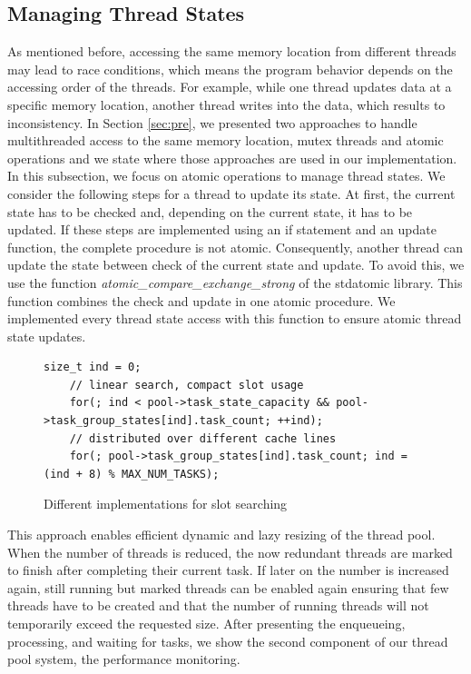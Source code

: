\documentclass[conference]{IEEEtran}
\begin{document}
\subsection{Managing Thread States}
As mentioned before, accessing the same memory location from different threads may lead to race conditions, which means the program behavior depends on the accessing order of the threads. For example, while one thread updates data at a specific memory location, another thread writes into the data, which results to inconsistency. In Section \ref{sec:pre}, we presented two approaches to handle multithreaded access to the same memory location, mutex threads and atomic operations and we state where those approaches are used in our implementation. In this subsection, we focus on atomic operations to manage thread states. We consider the following steps for a thread to update its state. At first, the current state has to be checked and, depending on the current state, it has to be updated. If these steps are implemented using an if statement and an update function, the complete procedure is not atomic. Consequently, another thread can update the state between check of the current state and update. To avoid this, we use the function \emph{atomic\_compare\_exchange\_strong} \cite{atomicstrong} of the stdatomic library. This function combines the check and update in one atomic procedure. We implemented every thread state access with this function to ensure atomic thread state updates. 

\begin{figure}
	\begin{lstlisting}[style=CStyle,numbers=none]
	size_t ind = 0;
	// linear search, compact slot usage
	for(; ind < pool->task_state_capacity && pool->task_group_states[ind].task_count; ++ind);
	// distributed over different cache lines
	for(; pool->task_group_states[ind].task_count; ind = (ind + 8) % MAX_NUM_TASKS);
	\end{lstlisting}
	\caption{Different implementations for slot searching}
	\label{fig10}
\end{figure}

This approach enables efficient dynamic and lazy resizing of the thread pool. When the number of threads is reduced, the now redundant threads are marked to finish after completing their current task. If later on the number is increased again, still running but marked threads can be enabled again ensuring that few threads have to be created and that the number of running threads will not temporarily exceed the requested size. 
 After presenting the enqueueing, processing, and waiting for tasks, we show the second component of our thread pool system, the performance monitoring.
\end{document}
